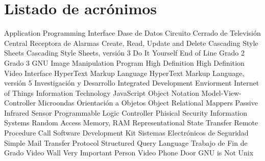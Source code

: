 \chapter{Listado de acrónimos}

{\small
\begin{acronym}[XXXXXXXX]
       {Application Programming Interface}
      {Dase de Datos}
      {Circuito Cerrado de Televisión}
       {Central Receptora de Alarmas}
      {Create, Read, Update and Delete}
       {Cascading Style Sheets}
      {Cascading Style Sheets, versión 3}
       {Do It Yourself}
       {End of Line}
       {Grado 2}
      {Grado 3}
      {GNU Image Manipulation Program}
        {High Definition}
     {High Definition Video Interface}
     {HyperText Markup Language}
     {HyperText Markup Language, versión 5}
       {Investigación y Desarrollo}
       {Integrated Development Enviorment}
       {Internet of Things}
        {Information Technology}
      {JavaScript Object Notation}
       {Model-View-Controller}
        {Microondas}
        {Orientación a Objetos}
       {Object Relational Mappers}
       {Passive Infrared Sensor}
       {Programmable Logic Controller}
      {Phisical Security Information Systems}
       {Random Access Memory, RAM}
      {Representational State Transfer}
       {Remote Procedure Call}
       {Software Development Kit}
       {Sistemas Electrónicos de Seguridad}
      {Simple Mail Transfer Protocol}
       {Structured Query Language}
       {Trabajo de Fin de Grado}
   {Video Wall}
       {Very Important Person}
       {Video Phone Door}
       {\acs{GNU} is Not Unix} 
\end{acronym}
}




